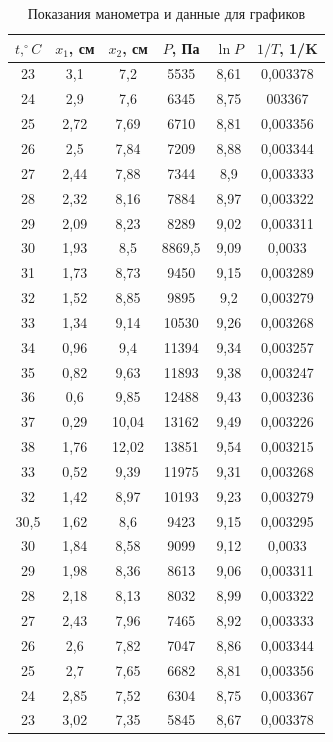 \documentclass[12pt]{article}
\begin{document}
		\begin{table}[h]

			\centering
		\begin{tabular}{|c|c|c||c|c|c|}
			\hline 
			$t, ^{\circ}C$ & $x_1$, см  & $x_2$, см & $P$, Па & $\ln P$ & $1/T$, 1/K \\ 
			\hline 
			23& 3,1 & 7,2 & 5535 & 8,61 & 0,003378 \\ 
			\hline 
			24& 2,9 & 7,6 & 6345 & 8,75 & 003367 \\ 
			\hline 
			25& 2,72 & 7,69 & 6710 & 8,81 & 0,003356 \\ 
			\hline 
			26& 2,5 & 7,84 & 7209 & 8,88 & 0,003344  \\ 
			\hline 
			27& 2,44  & 7,88 & 7344 & 8,9 & 0,003333\\ 
			\hline 
			28& 2,32 &  8,16 & 7884 & 8,97 & 0,003322\\ 
			\hline 
			29& 2,09 & 8,23 & 8289 & 9,02 & 0,003311 \\ 
			\hline 
			30& 1,93 & 8,5 & 8869,5 & 9,09 & 0,0033 \\ 
			\hline 
			31& 1,73 & 8,73 & 9450 & 9,15 & 0,003289\\ 
			\hline 
			32& 1,52 & 8,85 & 9895 & 9,2 & 0,003279\\ 
			\hline 
			33& 1,34 & 9,14 & 10530 & 9,26 & 0,003268\\ 
			\hline 
			34& 0,96 & 9,4 & 11394 & 9,34 & 0,003257\\ 
			\hline 
			35& 0,82 &  9,63 & 11893 & 9,38 & 0,003247\\ 
			\hline 
			36& 0,6 & 9,85 & 12488 & 9,43 & 0,003236\\ 
			\hline 
			37& 0,29 &  10,04 & 13162 & 9,49 & 0,003226\\ 
			\hline 
			38&  1,76 &  12,02 & 13851 & 9,54 & 0,003215\\ 
			\hline 
			\hline 
			33& 0,52 & 9,39 & 11975 & 9,31 & 0,003268\\ 
			\hline 
			32& 1,42 & 8,97 & 10193 & 9,23 & 0,003279\\ 
			\hline 
			30,5& 1,62 & 8,6 & 9423 & 9,15 & 0,003295\\ 
			\hline 
			30& 1,84 & 8,58 & 9099 & 9,12 & 0,0033\\ 
			\hline 
			29& 1,98 & 8,36 & 8613 & 9,06 & 0,003311 \\ 
			\hline 
			28& 2,18 & 8,13 & 8032 & 8,99 & 0,003322 \\ 
			\hline 
			27& 2,43 & 7,96 & 7465 & 8,92 & 0,003333\\ 
			\hline 
			26& 2,6 & 7,82 & 7047 & 8,86 & 0,003344\\ 
			\hline 
			25& 2,7 & 7,65 & 6682 & 8,81 & 0,003356\\ 
			\hline 
			24&  2,85&  7,52 & 6304 & 8,75 & 0,003367\\ 
			\hline 
			23& 3,02 & 7,35 & 5845 & 8,67 & 0,003378\\ 
			\hline 
						
					\end{tabular} \caption{Показания манометра и данные для графиков}

				\end{table}
				
\end{document}
